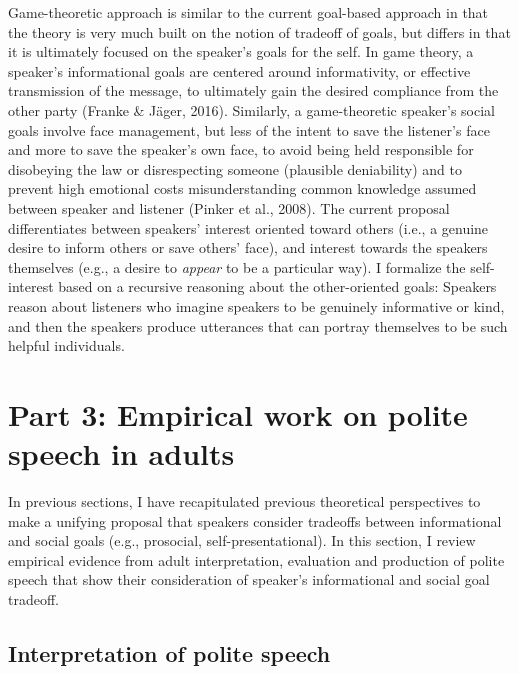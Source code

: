 \documentclass[oneside]{report}
\begin{document}
Game-theoretic approach is similar to the current goal-based approach in
that the theory is very much built on the notion of tradeoff of goals,
but differs in that it is ultimately focused on the speaker's goals for
the self. In game theory, a speaker's informational goals are centered
around informativity, or effective transmission of the message, to
ultimately gain the desired compliance from the other party (Franke \&
Jäger, 2016). Similarly, a game-theoretic speaker's social goals involve
face management, but less of the intent to save the listener's face and
more to save the speaker's own face, to avoid being held responsible for
disobeying the law or disrespecting someone (plausible deniability) and
to prevent high emotional costs misunderstanding common knowledge
assumed between speaker and listener (Pinker et al., 2008). The current
proposal differentiates between speakers' interest oriented toward
others (i.e., a genuine desire to inform others or save others' face),
and interest towards the speakers themselves (e.g., a desire to
\emph{appear} to be a particular way). I formalize the self-interest
based on a recursive reasoning about the other-oriented goals: Speakers
reason about listeners who imagine speakers to be genuinely informative
or kind, and then the speakers produce utterances that can portray
themselves to be such helpful individuals.

\section{Part 3: Empirical work on polite speech in
adults}\label{part-3-empirical-work-on-polite-speech-in-adults}

In previous sections, I have recapitulated previous theoretical
perspectives to make a unifying proposal that speakers consider
tradeoffs between informational and social goals (e.g., prosocial,
self-presentational). In this section, I review empirical evidence from
adult interpretation, evaluation and production of polite speech that
show their consideration of speaker's informational and social goal
tradeoff.

\subsection{Interpretation of polite
speech}\label{interpretation-of-polite-speech}
\end{document}
